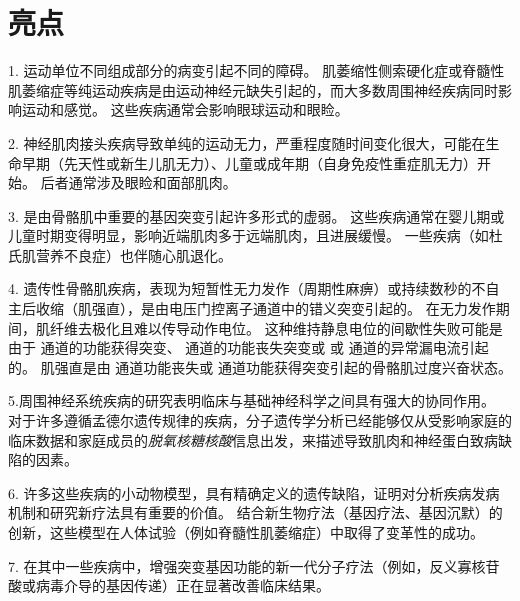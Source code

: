 \section{亮点}

1. 运动单位不同组成部分的病变引起不同的障碍。
肌萎缩性侧索硬化症或脊髓性肌萎缩症等纯运动疾病是由运动神经元缺失引起的，而大多数周围神经疾病同时影响运动和感觉。
这些疾病通常会影响眼球运动和眼睑。


2. 神经肌肉接头疾病导致单纯的运动无力，严重程度随时间变化很大，可能在生命早期（先天性或新生儿肌无力）、儿童或成年期（自身免疫性重症肌无力）开始。
后者通常涉及眼睑和面部肌肉。


3. 是由骨骼肌中重要的基因突变引起许多形式的虚弱。
这些疾病通常在婴儿期或儿童时期变得明显，影响近端肌肉多于远端肌肉，且进展缓慢。
一些疾病（如杜氏肌营养不良症）也伴随心肌退化。


4. 遗传性骨骼肌疾病，表现为短暂性无力发作（周期性麻痹）或持续数秒的不自主后收缩（肌强直），是由电压门控离子通道中的错义突变引起的。
在无力发作期间，肌纤维去极化且难以传导动作电位。
这种维持静息电位的间歇性失败可能是由于  通道的功能获得突变、 通道的功能丧失突变或  或  通道的异常漏电流引起的。
肌强直是由  通道功能丧失或  通道功能获得突变引起的骨骼肌过度兴奋状态。


5.周围神经系统疾病的研究表明临床与基础神经科学之间具有强大的协同作用。
对于许多遵循孟德尔遗传规律的疾病，分子遗传学分析已经能够仅从受影响家庭的临床数据和家庭成员的\textit{脱氧核糖核酸}信息出发，来描述导致肌肉和神经蛋白致病缺陷的因素。


6. 许多这些疾病的小动物模型，具有精确定义的遗传缺陷，证明对分析疾病发病机制和研究新疗法具有重要的价值。
结合新生物疗法（基因疗法、基因沉默）的创新，这些模型在人体试验（例如脊髓性肌萎缩症）中取得了变革性的成功。


7. 在其中一些疾病中，增强突变基因功能的新一代分子疗法（例如，反义寡核苷酸或病毒介导的基因传递）正在显著改善临床结果。


